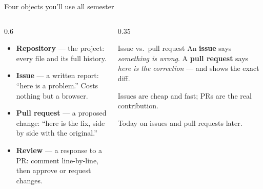 \documentclass[9pt,aspectratio=169]{beamer}
\begin{document}
\begin{frame}{Four objects you'll use all semester}
    \begin{columns}[T]
        \begin{column}{0.6\textwidth}
            \begin{itemize}
                \item \textbf{Repository} --- the project: every file and its full history.
                \smallskip
                \item \textbf{Issue} --- a written report: ``here is a problem.'' Costs nothing but a browser.
                \smallskip
                \item \textbf{Pull request} --- a proposed change: ``here is the fix, side by side with the original.''
                \smallskip
                \item \textbf{Review} --- a response to a PR: comment line-by-line, then approve or request changes.
            \end{itemize}
        \end{column}
        \begin{column}{0.35\textwidth}
            \begin{alertblock}{Issue vs.\ pull request}
                \footnotesize An \textbf{issue} says \textit{something is wrong}. A \textbf{pull request} says \textit{here is the correction} --- and shows the exact diff.
                \smallskip

                Issues are cheap and fast; PRs are the real contribution. 
                
                \smallskip
                Today on issues and pull requests later.
            \end{alertblock}
        \end{column}
    \end{columns}
\end{frame}
\end{document}
